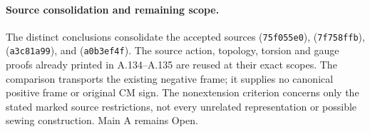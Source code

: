 \paragraph{Source consolidation and remaining scope.}
The distinct conclusions consolidate the accepted sources
(\texttt{75f055e0}),
(\texttt{7f758ffb}),
(\texttt{a3c81a99}), and
(\texttt{a0b3ef4f}). The source action, topology, torsion and gauge
proofs already printed in A.134--A.135 are reused at their exact
scopes. The comparison transports the existing negative frame;
it supplies no canonical positive frame or original CM sign.
The nonextension criterion concerns only the stated marked
source restrictions, not every unrelated representation or
possible sewing construction. Main A remains Open.
